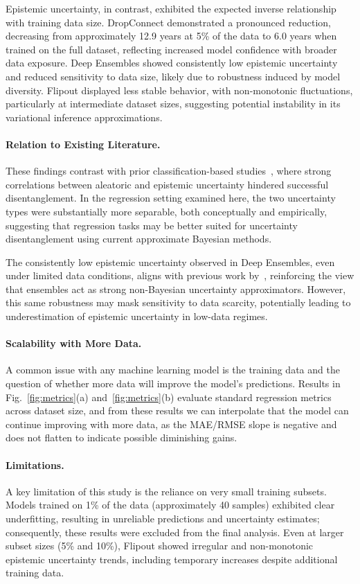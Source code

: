 \documentclass[runningheads]{llncs}
\begin{document}
Epistemic uncertainty, in contrast, exhibited the expected inverse relationship with training data size. DropConnect demonstrated a pronounced reduction, decreasing from approximately 12.9 years at 5\% of the data to 6.0 years when trained on the full dataset, reflecting increased model confidence with broader data exposure. Deep Ensembles showed consistently low epistemic uncertainty and reduced sensitivity to data size, likely due to robustness induced by model diversity. Flipout displayed less stable behavior, with non-monotonic fluctuations, particularly at intermediate dataset sizes, suggesting potential instability in its variational inference approximations.

\paragraph{Relation to Existing Literature.}
These findings contrast with prior classification-based studies~\cite{dejong2025measuring}, where strong correlations between aleatoric and epistemic uncertainty hindered successful disentanglement. In the regression setting examined here, the two uncertainty types were substantially more separable, both conceptually and empirically, suggesting that regression tasks may be better suited for uncertainty disentanglement using current approximate Bayesian methods.

The consistently low epistemic uncertainty observed in Deep Ensembles, even under limited data conditions, aligns with previous work by~\cite{lakshminarayanan2017simple}, reinforcing the view that ensembles act as strong non-Bayesian uncertainty approximators. However, this same robustness may mask sensitivity to data scarcity, potentially leading to underestimation of epistemic uncertainty in low-data regimes.

\paragraph{Scalability with More Data.}
A common issue with any machine learning model is the training data and the question of whether more data will improve the model's predictions. Results in Fig.~\ref{fig:metrics}(a) and~\ref{fig:metrics}(b) evaluate standard regression metrics across dataset size, and from these results we can interpolate that the model can continue improving with more data, as the MAE/RMSE slope is negative and does not flatten to indicate possible diminishing gains.

\paragraph{Limitations.}
A key limitation of this study is the reliance on very small training subsets. Models trained on 1\% of the data (approximately 40 samples) exhibited clear underfitting, resulting in unreliable predictions and uncertainty estimates; consequently, these results were excluded from the final analysis. Even at larger subset sizes (5\% and 10\%), Flipout showed irregular and non-monotonic epistemic uncertainty trends, including temporary increases despite additional training data.
\end{document}
